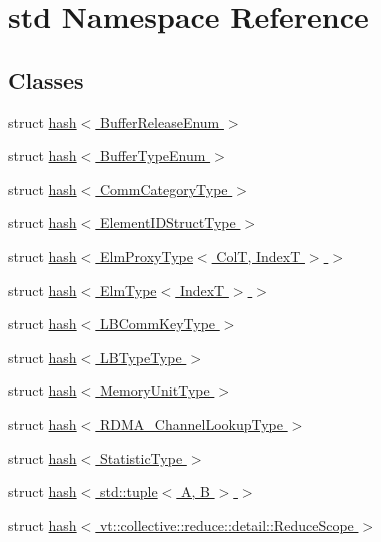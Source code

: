 \hypertarget{namespacestd}{}\section{std Namespace Reference}
\label{namespacestd}
\subsection*{Classes}
\begin{DoxyCompactItemize}
\item 
struct \hyperlink{structstd_1_1hash_3_01_buffer_release_enum_01_4}{hash$<$ Buffer\+Release\+Enum $>$}
\item 
struct \hyperlink{structstd_1_1hash_3_01_buffer_type_enum_01_4}{hash$<$ Buffer\+Type\+Enum $>$}
\item 
struct \hyperlink{structstd_1_1hash_3_01_comm_category_type_01_4}{hash$<$ Comm\+Category\+Type $>$}
\item 
struct \hyperlink{structstd_1_1hash_3_01_element_i_d_struct_type_01_4}{hash$<$ Element\+I\+D\+Struct\+Type $>$}
\item 
struct \hyperlink{structstd_1_1hash_3_01_elm_proxy_type_3_01_col_t_00_01_index_t_01_4_01_4}{hash$<$ Elm\+Proxy\+Type$<$ Col\+T, Index\+T $>$ $>$}
\item 
struct \hyperlink{structstd_1_1hash_3_01_elm_type_3_01_index_t_01_4_01_4}{hash$<$ Elm\+Type$<$ Index\+T $>$ $>$}
\item 
struct \hyperlink{structstd_1_1hash_3_01_l_b_comm_key_type_01_4}{hash$<$ L\+B\+Comm\+Key\+Type $>$}
\item 
struct \hyperlink{structstd_1_1hash_3_01_l_b_type_type_01_4}{hash$<$ L\+B\+Type\+Type $>$}
\item 
struct \hyperlink{structstd_1_1hash_3_01_memory_unit_type_01_4}{hash$<$ Memory\+Unit\+Type $>$}
\item 
struct \hyperlink{structstd_1_1hash_3_01_r_d_m_a___channel_lookup_type_01_4}{hash$<$ R\+D\+M\+A\+\_\+\+Channel\+Lookup\+Type $>$}
\item 
struct \hyperlink{structstd_1_1hash_3_01_statistic_type_01_4}{hash$<$ Statistic\+Type $>$}
\item 
struct \hyperlink{structstd_1_1hash_3_01std_1_1tuple_3_01_a_00_01_b_01_4_01_4}{hash$<$ std\+::tuple$<$ A, B $>$ $>$}
\item 
struct \hyperlink{structstd_1_1hash_3_01vt_1_1collective_1_1reduce_1_1detail_1_1_reduce_scope_01_4}{hash$<$ vt\+::collective\+::reduce\+::detail\+::\+Reduce\+Scope $>$}
\item 

\end{DoxyCompactItemize}
